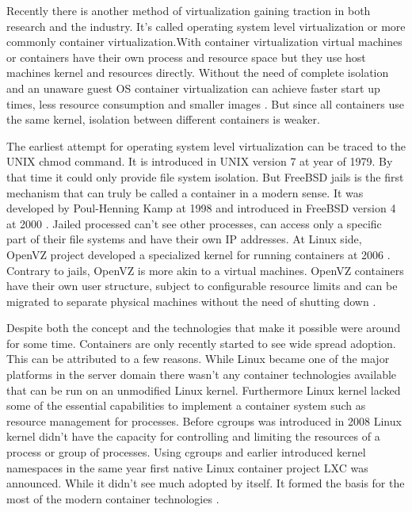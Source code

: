 \documentclass[12pt,oneandhalf,chaparabic,ceng,ms,eng,oneside,pntc]{gsufbe}
\begin{document}
Recently there is another method of virtualization gaining traction in both research and the industry.
It's called operating system level virtualization or more commonly container virtualization.With
container virtualization virtual machines or containers have their own process and resource space but
they use host machines kernel and resources directly.  Without the need of complete isolation and an
unaware guest OS container virtualization can achieve faster start up times, less resource consumption
and smaller images \cite{joy_performance_2015}.  But since all containers use the same kernel, isolation
between different containers is weaker.

The earliest attempt for operating system level virtualization can be traced to the UNIX chmod command.
It is introduced in UNIX version 7 at year of 1979.  By that time it could only provide file system
isolation.  But FreeBSD jails is the first mechanism that can truly be called a container in a modern
sense.  It was developed by Poul-Henning Kamp at 1998 and introduced in FreeBSD version 4 at 2000 
\cite{kamp_jails_2000}.
Jailed processed can't see other processes, can access only a specific part of their file systems and
have their own IP addresses.  At Linux side, OpenVZ project developed a specialized kernel for running
containers at 2006 \cite{kolyshkin_virtualization_2006}.  Contrary to jails, OpenVZ is more akin to a
virtual machines.  OpenVZ containers
have their own user structure, subject to configurable resource limits and can be migrated to separate
physical machines without the need of shutting down \cite{bernstein_containers_2014}.

Despite both the concept and the technologies that make it possible were around for some time.
Containers are only recently started to see wide spread adoption.  This can be attributed to a few
reasons.  While Linux became one of the major platforms in the server domain there wasn't any container
technologies available that can be run on an unmodified Linux kernel.  Furthermore Linux kernel lacked
some of the essential capabilities to implement a container system such as resource management for
processes.  Before cgroups was introduced in 2008 Linux kernel didn't have the capacity for controlling
and limiting the resources of a process or group of processes.  Using cgroups and earlier introduced
kernel namespaces in the same year first native Linux
container project LXC \cite{lxc} was announced.  While it didn't see much adopted by itself.  It formed
the basis
for the most of the modern container technologies \cite{singh_containers_2016}.
\end{document}
